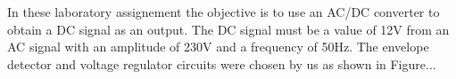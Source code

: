 In these laboratory assignement the objective is to use an AC/DC converter to obtain a DC signal as an output. The DC signal must be a value of 12V from an AC signal with an amplitude of 230V and a frequency of 50Hz. The envelope detector and voltage regulator circuits were chosen by us as shown in Figure... 




